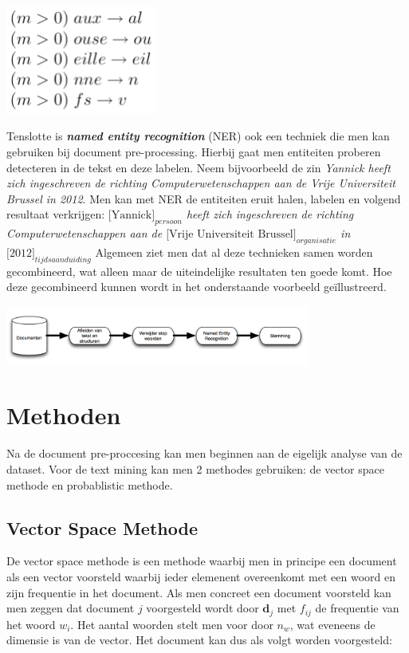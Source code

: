 \newline
\begin{center}
  \includegraphics[width=5cm]{stemming_regels_frans}
\end{center}
Tenslotte is \textbf{\textit{named entity recognition}} (NER) ook een techniek die men kan gebruiken bij document pre-processing. Hierbij gaat men entiteiten proberen detecteren in de tekst en deze labelen. Neem bijvoorbeeld de zin \textit{Yannick heeft zich ingeschreven de richting Computerwetenschappen aan de Vrije Universiteit Brussel in 2012}. Men kan met NER de entiteiten eruit halen, labelen en volgend resultaat verkrijgen: \textit{$\text{[Yannick]}_{persoon}$ heeft zich ingeschreven de richting Computerwetenschappen aan de $\text{[Vrije Universiteit Brussel]}_{organisatie}$ in $\text{[2012]}_{tijdsaanduiding}$}
\newline
Algemeen ziet men dat al deze technieken samen worden gecombineerd, wat alleen maar de uiteindelijke resultaten ten goede komt. Hoe deze gecombineerd kunnen wordt in het onderstaande voorbeeld ge\"illustreerd. 
\newline
\begin{center}
  \includegraphics[width=10cm]{document_preprocessing}
\end{center}

\section{Methoden}\label{Methoden}
Na de document pre-proccesing kan men beginnen aan de eigelijk analyse van de dataset. Voor de text mining kan men 2 methodes gebruiken: de vector space methode en  probablistic methode.
\subsection{Vector Space Methode}\label{Vector Space Methode}
De vector space methode is een methode waarbij men in principe een document als een vector voorsteld waarbij ieder elemenent overeenkomt met een woord en zijn frequentie in het document. Als men concreet een document voorsteld kan men zeggen dat document $j$ voorgesteld wordt door $\textbf{d}_{j}$ met $f_{ij}$ de frequentie van het woord $w_{i}$. Het aantal woorden stelt men voor door $n_{w}$, wat eveneens de dimensie is van de vector.
Het document kan dus als volgt worden voorgesteld:


